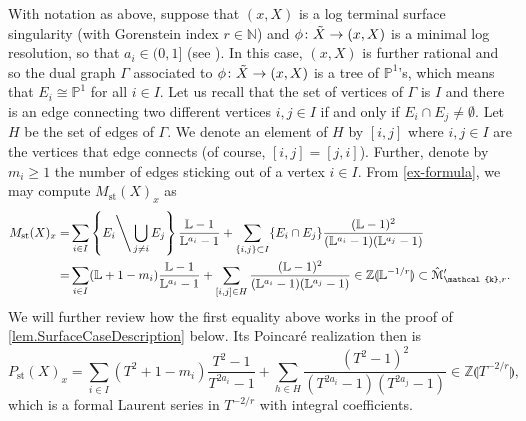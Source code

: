 \documentclass[12pt]{amsart}
\theoremstyle{plain}   %
\theoremstyle{definition}    %
\theoremstyle{remark}    %
\numberwithin{equation}{theorem}
\DeclareMathOperator{\st}{\mathrm{st}}
\newcommand{\kay}{\mathcal{k}}
\newcommand{\sM}{\mathcal{M}}
\newcommand{\bL}{\mathbb{L}}
\newcommand{\bN}{\mathbb{N}}
\newcommand{\bP}{\mathbb{P}}
\newcommand{\bZ}{\mathbb{Z}}
\begin{document}
\begin{example} \label{ex.Surfaces}
 With notation as above, suppose that $(x,X)$ is a log terminal surface singularity (with Gorenstein index $r \in \bN$) and $\phi \colon \Tilde{X} \to (x,X)$ is a minimal log resolution, so that $a_i \in (0,1]$ (see \cite[Claim 2.26.4, p. 56]{KollarSingulaitieofMMP}). In this case, $(x,X)$ is further rational and so the dual graph $\Gamma$ associated to $\phi \colon \Tilde{X} \to (x,X)$ is a tree of $\bP^1$'s, which means that $E_i \cong \bP^1$ for all $i \in I$. Let us recall that the set of vertices of $\Gamma$ is $I$ and there is an edge connecting two different vertices $i,j \in I$ if and only if $E_i \cap E_j \neq \emptyset$. Let $H$ be the set of edges of $\Gamma$. We denote an element of $H$ by $[i,j]$ where $i,j\in I$ are the vertices that edge connects (of course, $[i,j]=[j,i]$). Further, denote by $m_i \geq 1$ the number of edges sticking out of a vertex $i\in I$. From \autoref{ex-formula}, we may compute $M_{\st}(X)_x$ as
\begin{align*}
    M_{\st}(X)_x = &\sum_{i\in I}\left\{E_{i} \Bigg\backslash \bigcup_{j \neq i} E_j \right\}\frac{\bL-1}{\bL^{a_{i}}-1}+\sum_{\{i,j\}\subset I}\{E_{i}\cap E_{j}\}\frac{(\bL-1)^{2}}{(\bL^{a_{i}}-1)(\bL^{a_{j}}-1)}\\
    = &\sum_{i\in I} (\bL +1 - m_i) \frac{\bL-1}{\bL^{a_{i}}-1}+\sum_{[i,j]\in H}\frac{(\bL-1)^{2}}{(\bL^{a_i}-1)(\bL^{a_j}-1)} \in \bZ\llparenthesis\bL^{-1/r} \rrparenthesis \subset \hat{\sM}'_{\kay,r}.
\end{align*}
We will further review how the first equality above works in the proof of \autoref{lem.SurfaceCaseDescription} below. Its Poincar\'e realization then is
\[
P_{\st}(X)_x =  \sum_{i\in I} (T^2 +1 - m_i) \frac{T^2-1}{T^{2a_{i}}-1}+\sum_{h\in H}\frac{(T^2-1)^{2}}{(T^{2a_i}-1)(T^{2a_j}-1)} \in \bZ\llparenthesis T^{-2/r} \rrparenthesis,
\]
which is a formal Laurent series in $T^{-2/r}$ with integral coefficients.
\end{example}
\end{document}
